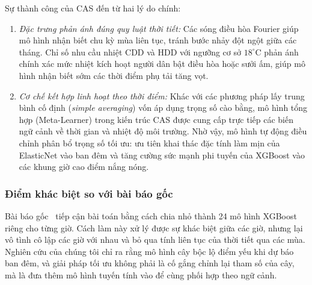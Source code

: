 Sự thành công của CAS đến từ hai lý do chính:
\begin{enumerate}
    \item \textit{Đặc trưng phản ánh đúng quy luật thời tiết:} Các sóng điều hòa Fourier giúp mô hình nhận biết chu kỳ mùa liên tục, tránh bước nhảy đột ngột giữa các tháng. Chỉ số nhu cầu nhiệt CDD và HDD với ngưỡng cơ sở $18^\circ\text{C}$ phản ánh chính xác mức nhiệt kích hoạt người dân bật điều hòa hoặc sưởi ấm, giúp mô hình nhận biết sớm các thời điểm phụ tải tăng vọt.
    \item \textit{Cơ chế kết hợp linh hoạt theo thời điểm:} Khác với các phương pháp lấy trung bình cố định (\textit{simple averaging}) vốn áp dụng trọng số cào bằng, mô hình tổng hợp (Meta-Learner) trong kiến trúc CAS được cung cấp trực tiếp các biến ngữ cảnh về thời gian và nhiệt độ môi trường. Nhờ vậy, mô hình tự động điều chỉnh phân bổ trọng số tối ưu: ưu tiên khai thác đặc tính làm mịn của ElasticNet vào ban đêm và tăng cường sức mạnh phi tuyến của XGBoost vào các khung giờ cao điểm nắng nóng.
\end{enumerate}

\subsubsection{Điểm khác biệt so với bài báo gốc}
Bài báo gốc~\cite{roy2025hourly} tiếp cận bài toán bằng cách chia nhỏ thành 24 mô hình XGBoost riêng cho từng giờ. Cách làm này xử lý được sự khác biệt giữa các giờ, nhưng lại vô tình cô lập các giờ với nhau và bỏ qua tính liên tục của thời tiết qua các mùa. Nghiên cứu của chúng tôi chỉ ra rằng mô hình cây bộc lộ điểm yếu khi dự báo ban đêm, và giải pháp tối ưu không phải là cố gắng chỉnh lại tham số của cây, mà là đưa thêm mô hình tuyến tính vào để cùng phối hợp theo ngữ cảnh.

